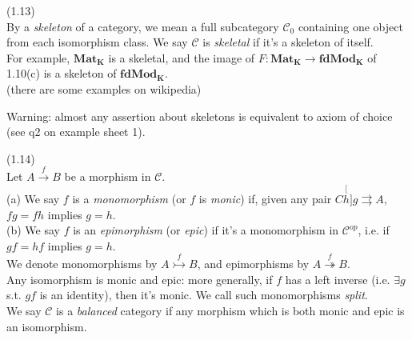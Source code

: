 \documentclass[a4paper]{article}
\begin{document}
\begin{defi} (1.13) \\
    By a \emph{skeleton} of a category, we mean a full subcategory $\mathcal{C}_0$ containing one object from each isomorphism class. We say $\mathcal{C}$ is \emph{skeletal} if it's a skeleton of itself.\\
    For example, $\mathbf{Mat_K}$ is a skeletal, and the image of $F:\mathbf{Mat_K} \to \mathbf{fdMod_K}$ of 1.10(c) is a skeleton of $\mathbf{fdMod_K}$.\\
    (there are some examples on wikipedia)
\end{defi}

Warning: almost any assertion about skeletons is equivalent to axiom of choice (see q2 on example sheet 1).

\begin{defi} (1.14)\\
    Let $A \xrightarrow{f} B$ be a morphism in $\mathcal{C}$.\\
    (a) We say $f$ is a \emph{monomorphism} (or $f$ is \emph{monic}) if, given any pair $C \stackrel[h]{g}{\rightrightarrows} A$, $fg=fh$ implies $g=h$.\\
    (b) We say $f$ is an \emph{epimorphism} (or \emph{epic}) if it's a monomorphism in $\mathcal{C}^{op}$, i.e. if $gf = hf$ implies $g=h$.\\
    We denote monomorphisms by $A \stackrel{f}{\rightarrowtail} B$, and epimorphisms by $A \stackrel{f}{\twoheadrightarrow} B$.\\
    Any isomorphism is monic and epic: more generally, if $f$ has a left inverse (i.e. $\exists g$ s.t. $gf$ is an identity), then it's monic. We call such monomorphisms \emph{split}.\\
    We say $\mathcal{C}$ is a \emph{balanced} category if any morphism which is both monic and epic is an isomorphism.
\end{defi}
\end{document}
